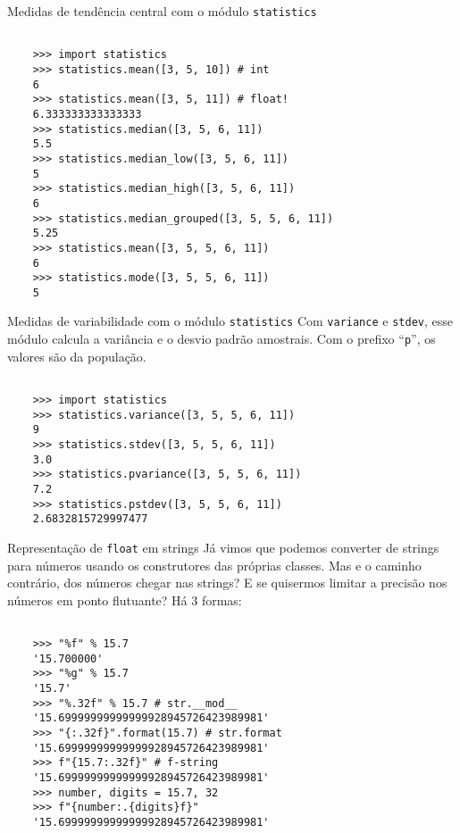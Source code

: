 \documentclass[utf8]{beamer}
\begin{document}
\begin{frame}[fragile]{Medidas de tendência central
                       com o módulo \texttt{statistics}}
  \begin{verbatim}

    >>> import statistics
    >>> statistics.mean([3, 5, 10]) # int
    6
    >>> statistics.mean([3, 5, 11]) # float!
    6.333333333333333
    >>> statistics.median([3, 5, 6, 11])
    5.5
    >>> statistics.median_low([3, 5, 6, 11])
    5
    >>> statistics.median_high([3, 5, 6, 11])
    6
    >>> statistics.median_grouped([3, 5, 5, 6, 11])
    5.25
    >>> statistics.mean([3, 5, 5, 6, 11])
    6
    >>> statistics.mode([3, 5, 5, 6, 11])
    5

  \end{verbatim}
\end{frame}


\begin{frame}[fragile]{Medidas de variabilidade
                       com o módulo \texttt{statistics}}
  Com \texttt{variance} e \texttt{stdev},
  esse módulo calcula a variância e o desvio padrão amostrais.
  Com o prefixo ``\texttt{p}'',
  os valores são da população.

  \begin{verbatim}

    >>> import statistics
    >>> statistics.variance([3, 5, 5, 6, 11])
    9
    >>> statistics.stdev([3, 5, 5, 6, 11])
    3.0
    >>> statistics.pvariance([3, 5, 5, 6, 11])
    7.2
    >>> statistics.pstdev([3, 5, 5, 6, 11])
    2.6832815729997477

  \end{verbatim}
\end{frame}


\begin{frame}[fragile]{Representação de \texttt{float} em strings}
  Já vimos que podemos converter de strings para números
  usando os construtores das próprias classes.
  Mas e o caminho contrário, dos números chegar nas strings?
  E se quisermos limitar a precisão
  nos números em ponto flutuante? Há $3$ formas:

  \begin{verbatim}

    >>> "%f" % 15.7
    '15.700000'
    >>> "%g" % 15.7
    '15.7'
    >>> "%.32f" % 15.7 # str.__mod__
    '15.69999999999999928945726423989981'
    >>> "{:.32f}".format(15.7) # str.format
    '15.69999999999999928945726423989981'
    >>> f"{15.7:.32f}" # f-string
    '15.69999999999999928945726423989981'
    >>> number, digits = 15.7, 32
    >>> f"{number:.{digits}f}"
    '15.69999999999999928945726423989981'

  \end{verbatim}

\end{frame}
\end{document}
